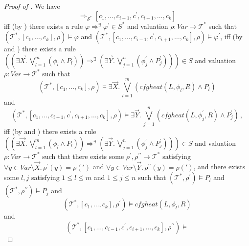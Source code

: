 \documentclass{article}
\begin{document}
\begin{proof}[Proof of ]
We have
\begin{equation*}
[c_1,\ldots,c_k] \Rightarrow_{\mathcal{S}^*} [c_1, \ldots, c_{i-1}, c^\prime, c_{i+1}, \ldots, c_k]    
\end{equation*}
iff (by ) there exists a rule $\varphi \Rightarrow^\exists \varphi^\prime \in S^*$
and valuation $\rho : \mathit{Var} \to \mathcal{T}^*$ such that
$(\mathcal{T}^*, [c_1,\ldots,c_k], \rho) \vDash \varphi$
and $(\mathcal{T}^*, [c_1, \ldots, c_{i-1}, c^\prime, c_{i+1}, \ldots, c_k], \rho) \vDash \varphi^\prime$,
iff (by
 and )
there exists a rule $((\exists \vec{X}.\, \bigvee_{l=1}^{m} (\phi_l \land P_l)) \Rightarrow^\exists (\exists \vec{Y}.\, \bigvee_{j=1}^{n} (\phi^\prime_j \land P^\prime_j))) \in S$
and valuation $\rho : \mathit{Var} \to \mathcal{T}^*$ such that
\begin{equation*}
    (\mathcal{T}^*, [c_1,\ldots,c_k], \rho) \vDash \exists \vec{X}.\, \bigvee_{l=1}^{m}(\mathit{cfgheat}(L, \phi_l, R) \land P_l)
\end{equation*}
and
\begin{equation*}
    (\mathcal{T}^*, [c_1, \ldots, c_{i-1}, c^\prime, c_{i+1}, \ldots, c_k], \rho) \vDash
    \exists \vec{Y}.\, \bigvee_{j=1}^{n}(\mathit{cfgheat}(L, \phi^\prime_j, R) \land P^\prime_j) \, ,
\end{equation*}
iff (by  and )
there exists a rule $((\exists \vec{X}.\, \bigvee_{l=1}^{m} (\phi_l \land P_l)) \Rightarrow^\exists (\exists \vec{Y}.\, \bigvee_{j=1}^{n} (\phi^\prime_j \land P^\prime_j))) \in S$
and valuation $\rho : \mathit{Var} \to \mathcal{T}^*$ such that
there exists some $\rho^\prime,\rho^{\prime\prime} \to \mathcal{T}^*$
satisfying $\forall y \in \mathit{Var} \setminus \vec{X}.\, \rho^\prime(y) = \rho(\prime)$
and $\forall y \in \mathit{Var} \setminus \vec{Y}.\, \rho^{\prime\prime}(y) = \rho(\prime)$,
and there exists some $l,j$ satisfying $1 \leq l \leq m$ and $1 \leq j \leq n$ such that
$(\mathcal{T}^*, \rho^\prime) \vDash P_l$ and $(\mathcal{T}^*, \rho^{\prime\prime}) \vDash P_j$ and
\begin{equation*}
    (\mathcal{T}^*, [c_1,\ldots,c_k], \rho^\prime) \vDash \mathit{cfgheat}(L, \phi_l, R)
\end{equation*}
and
\begin{equation*}
    (\mathcal{T}^*, [c_1, \ldots, c_{i-1}, c^\prime, c_{i+1}, \ldots, c_k], \rho^{\prime\prime}) \vDash

\end{equation*}
\end{proof}
\end{document}
